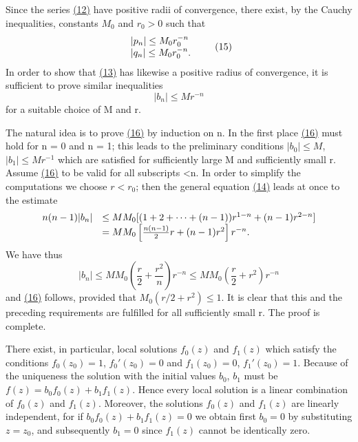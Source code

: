 Since the series \hyperref[eq:8.12]{(12)} have positive radii of convergence, there exist, by the Cauchy inequalities, constants $M_{0}$ and $r_{0} > 0$ such that
\begin{equation*}
\begin{array}{l l} | p _ {n} | \leq M _ {0} r _ {0} ^ {- n} \\ | q _ {n} | \leq M _ {0} r _ {0} ^ {- n}. \end{array}\tag{15}\label{eq:8.15}
\end{equation*}
In order to show that \hyperref[eq:8.13]{(13)} has likewise a positive radius of convergence, it is sufficient to prove similar inequalities
\begin{equation*}
\left| b _ {n} \right| \leq M r ^ {- n}\tag{16}\label{eq:8.16}
\end{equation*}
for a suitable choice of M and r.

The natural idea is to prove \hyperref[eq:8.16]{(16)} by induction on n. In the first place \hyperref[eq:8.16]{(16)} must hold for n = 0 and n = 1; this leads to the preliminary conditions $|b_{0}| \leq M$, $|b_{1}| \leq Mr^{-1}$ which are satisfied for sufficiently large M and sufficiently small r. Assume \hyperref[eq:8.16]{(16)} to be valid for all subscripts <n. In order to simplify the computations we choose $r < r_{0}$; then the general equation \hyperref[eq:8.14]{(14)} leads at once to the estimate
\begin{equation*}
\begin{array}{r l} n (n - 1) | b _ {n} | & \leq M M _ {0} [ (1 + 2 + \dots + (n - 1)) r ^ {1 - n} + (n - 1) r ^ {2 - n} ] \\ & = M M _ {0} \left[ \frac {n (n - 1)}{2} r + (n - 1) r ^ {2} \right] r ^ {- n}. \end{array}
\end{equation*}
We have thus
\begin{equation*}
\left| b _ {n} \right| \leq M M _ {0} \left(\frac {r}{2} + \frac {r ^ {2}}{n}\right) r ^ {- n} \leq M M _ {0} \left(\frac {r}{2} + r ^ {2}\right) r ^ {- n}
\end{equation*}
and \hyperref[eq:8.16]{(16)} follows, provided that $M_{0}(r/2 + r^{2}) \leq 1$. It is clear that this and the preceding requirements are fulfilled for all sufficiently small r. The proof is complete.

There exist, in particular, local solutions $f_0(z)$ and $f_1(z)$ which satisfy the conditions $f_0(z_0) = 1$, $f_0'(z_0) = 0$ and $f_1(z_0) = 0$, $f_1'(z_0) = 1$. Because
of the uniqueness the solution with the initial values $b_{0}$, $b_{1}$ must be $f(z) = b_{0}f_{0}(z) + b_{1}f_{1}(z)$. Hence every local solution is a linear combination of $f_{0}(z)$ and $f_{1}(z)$. Moreover, the solutions $f_{0}(z)$ and $f_{1}(z)$ are linearly independent, for if $b_{0}f_{0}(z) + b_{1}f_{1}(z) = 0$ we obtain first $b_{0} = 0$ by substituting $z = z_{0}$, and subsequently $b_{1} = 0$ since $f_{1}(z)$ cannot be identically zero.

